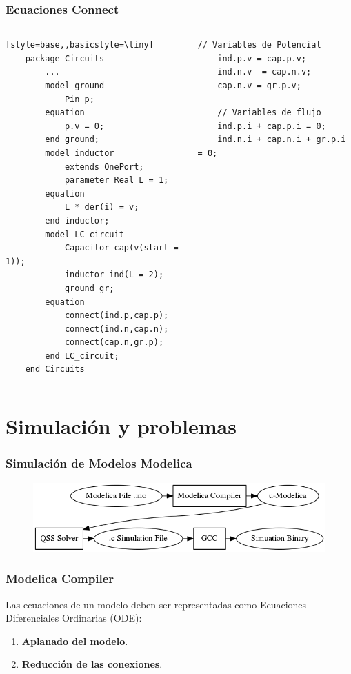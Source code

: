\documentclass[aspectratio=169,10pt]{beamer}
\begin{document}
\begin{frame}[fragile]
\frametitle{Ecuaciones Connect} 
\begin{columns}  
\column[T]{8cm}
 \begin{lstlisting}[style=base,,basicstyle=\tiny]
    package Circuits
        ...
        model ground
            Pin p;
        equation
            p.v = 0;
        end ground;
        model inductor
            extends OnePort;
            parameter Real L = 1;
        equation
            L * der(i) = v;
        end inductor;
        model LC_circuit
            Capacitor cap(v(start = 1));
            inductor ind(L = 2);
            ground gr;
        equation
            connect(ind.p,cap.p);
            connect(ind.n,cap.n);
            connect(cap.n,gr.p);
        end LC_circuit;
    end Circuits
\end{lstlisting}
\column[T]{6cm}
 \begin{lstlisting}[style=base]
    // Variables de Potencial
    ind.p.v = cap.p.v;
    ind.n.v  = cap.n.v;
    cap.n.v = gr.p.v;
    
    // Variables de flujo
    ind.p.i + cap.p.i = 0;
    ind.n.i + cap.n.i + gr.p.i = 0;
\end{lstlisting}
\end{columns}
\end{frame}

\section{Simulaci\'on y problemas}

\begin{frame}[fragile]
\frametitle{Simulaci\'on de Modelos Modelica} 
    \begin{figure}
      \centering
      \includegraphics[scale=0.5]{Compilacion} 
      \label{fig:proceso}
    \end{figure}
\end{frame}


\begin{frame}[fragile]
\frametitle{Modelica Compiler} 
 Las ecuaciones de un modelo deben ser representadas como Ecuaciones Diferenciales Ordinarias (ODE): 
 \begin{enumerate}
 \item \textbf{Aplanado del modelo}.
 \item \textbf{Reducci\'on de las conexiones}.
 \end{enumerate}
 
\end{frame}
\end{document}
